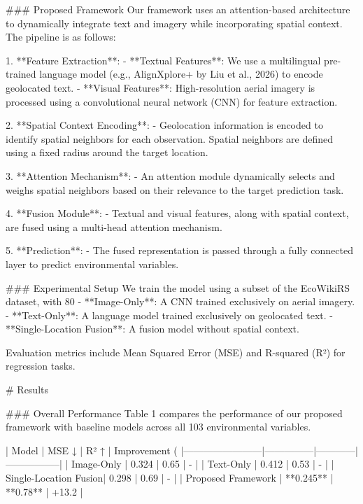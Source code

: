 ### Proposed Framework  
Our framework uses an attention-based architecture to dynamically integrate text and imagery while incorporating spatial context. The pipeline is as follows:

1. **Feature Extraction**:  
    - **Textual Features**: We use a multilingual pre-trained language model (e.g., AlignXplore+ by Liu et al., 2026) to encode geolocated text.  
    - **Visual Features**: High-resolution aerial imagery is processed using a convolutional neural network (CNN) for feature extraction.

2. **Spatial Context Encoding**:  
    - Geolocation information is encoded to identify spatial neighbors for each observation. Spatial neighbors are defined using a fixed radius around the target location.

3. **Attention Mechanism**:  
    - An attention module dynamically selects and weighs spatial neighbors based on their relevance to the target prediction task.

4. **Fusion Module**:  
    - Textual and visual features, along with spatial context, are fused using a multi-head attention mechanism. 

5. **Prediction**:  
    - The fused representation is passed through a fully connected layer to predict environmental variables.

### Experimental Setup  
We train the model using a subset of the EcoWikiRS dataset, with 80%
- **Image-Only**: A CNN trained exclusively on aerial imagery.  
- **Text-Only**: A language model trained exclusively on geolocated text.  
- **Single-Location Fusion**: A fusion model without spatial context.  

Evaluation metrics include Mean Squared Error (MSE) and R-squared (R²) for regression tasks.

# Results  

### Overall Performance  
Table 1 compares the performance of our proposed framework with baseline models across all 103 environmental variables.

| Model                  | MSE ↓         | R² ↑       | Improvement (%
|------------------------|---------------|------------|-----------------|
| Image-Only            | 0.324         | 0.65       | -               |
| Text-Only             | 0.412         | 0.53       | -               |
| Single-Location Fusion| 0.298         | 0.69       | -               |
| Proposed Framework    | **0.245**     | **0.78**   | +13.2           |

